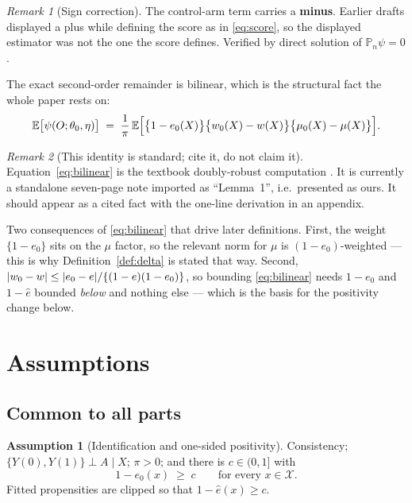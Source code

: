 \documentclass[11pt]{article}
\theoremstyle{plain}
\theoremstyle{definition}
\newtheorem{assumption}{Assumption}
\theoremstyle{remark}
\newtheorem{remark}{Remark}
\newcommand{\E}{\mathbb{E}}
\newcommand{\Pn}{\mathbb{P}_n}
\newcommand{\cX}{\mathcal{X}}
\newcommand{\ez}{e_0}
\newcommand{\mz}{\mu_0}
\newcommand{\wz}{w_0}
\newcommand{\ehat}{\widehat{e}}
\DeclarePairedDelimiter{\abs}{\lvert}{\rvert}
\begin{document}
\begin{remark}[Sign correction]\label{rem:sign}
The control-arm term carries a \textbf{minus}. Earlier drafts displayed a plus
while defining the score as in \eqref{eq:score}, so the displayed estimator was
not the one the score defines. Verified by direct solution of
$\Pn\psi=0$.
\end{remark}

The exact second-order remainder is bilinear, which is the structural fact the
whole paper rests on:
\begin{equation}\label{eq:bilinear}
  \E\bigl[\psi(O;\theta_0,\eta)\bigr]
  \;=\; \frac1\pi\,
  \E\Bigl[ \bigl\{1-\ez(X)\bigr\}\bigl\{\wz(X)-w(X)\bigr\}
           \bigl\{\mz(X)-\mu(X)\bigr\}\Bigr].
\end{equation}

\begin{remark}[This identity is standard; cite it, do not claim it]
Equation~\eqref{eq:bilinear} is the textbook doubly-robust computation
\citep{robins1995,vanderlaan2003,kennedy2024}. It is currently a standalone
seven-page note imported as ``Lemma~1'', i.e.\ presented as ours. It should
appear as a cited fact with the one-line derivation in an appendix.
\end{remark}

Two consequences of \eqref{eq:bilinear} that drive later definitions. First, the
weight $\{1-\ez\}$ sits on the $\mu$ factor, so the relevant norm for $\mu$ is
$(1-\ez)$-weighted --- this is why Definition~\ref{def:delta} is stated that way.
Second, $\abs{\wz-w}\le\abs{\ez-e}/\{(1-e)(1-\ez)\}$, so bounding
\eqref{eq:bilinear} needs $1-\ez$ and $1-\ehat$ bounded \emph{below} and nothing
else --- which is the basis for the positivity change below.

\section{Assumptions}

\subsection{Common to all parts}

\begin{assumption}[Identification and one-sided positivity]\label{ass:causal}
Consistency; $\{Y(0),Y(1)\}\perp A\mid X$; $\pi>0$; and there is $c\in(0,1]$
with
\[
  1-\ez(x)\;\ge\;c \qquad\text{for every }x\in\cX .
\]
Fitted propensities are clipped so that $1-\ehat(x)\ge c$.
\end{assumption}
\end{document}
